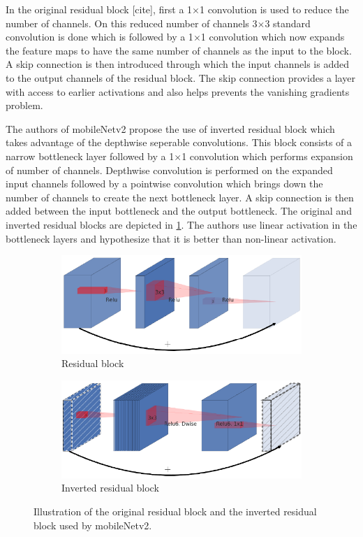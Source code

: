 In the original residual block [cite], first a 1$\times$1 convolution is used to reduce the number of channels. On this reduced number of channels 3$\times$3 standard convolution is done which is followed by a 1$\times$1 convolution which now expands the feature maps to have the same number of channels as the input to the block. A skip connection is then introduced through which the input channels is added to the output channels of the residual block. The skip connection provides a layer with access to earlier activations and also helps prevents the vanishing gradients problem. 

The authors of mobileNetv2 propose the use of inverted residual block which takes advantage of the depthwise seperable convolutions. This block consists of a narrow bottleneck layer followed by a 1$\times$1 convolution which performs expansion of number of channels. Depthwise convolution is performed on the expanded input channels followed by a pointwise convolution which brings down the number of channels to create the next bottleneck layer. A skip connection is then added between the input bottleneck and the output bottleneck. The original and inverted residual blocks are depicted in \ref{Fig:residual}. The authors use linear activation in the bottleneck layers and hypothesize that it is better than non-linear activation.

	\begin{figure}
		\begin{subfigure}{.5\textwidth}
			\centering
			\includegraphics[width=.8\linewidth]{images/residual}
			\caption{Residual block}
		\end{subfigure}
		\begin{subfigure}{.5\textwidth}
			\centering
			\includegraphics[width=.8\linewidth]{images/inverted_residual}
			\caption{Inverted residual block}
		\end{subfigure}
		\caption{Illustration of the original residual block and the inverted residual block used by mobileNetv2.}
		\label{Fig:residual}
	\end{figure}

